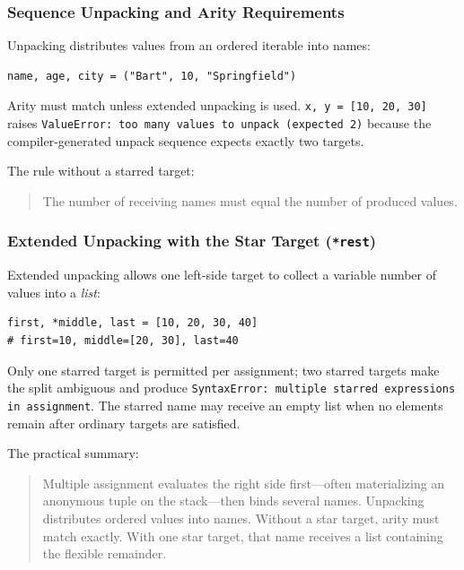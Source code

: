 \documentclass[a4paper,twoside]{report}
\begin{document}
\subsubsection{Sequence Unpacking and Arity Requirements}

Unpacking distributes values from an ordered iterable into names:

\begin{verbatim}
name, age, city = ("Bart", 10, "Springfield")
\end{verbatim}

Arity must match unless extended unpacking is used. \texttt{x, y = [10, 20, 30]} raises \texttt{ValueError: too many values to unpack (expected 2)} because the compiler-generated unpack sequence expects exactly two targets.

The rule without a starred target:

\begin{quote}
The number of receiving names must equal the number of produced values.
\end{quote}

\subsubsection{Extended Unpacking with the Star Target (\texttt{*rest})}

Extended unpacking allows one left-side target to collect a variable number of values into a \emph{list}:

\begin{verbatim}
first, *middle, last = [10, 20, 30, 40]
# first=10, middle=[20, 30], last=40
\end{verbatim}

Only one starred target is permitted per assignment; two starred targets make the split ambiguous and produce \texttt{SyntaxError: multiple starred expressions in assignment}. The starred name may receive an empty list when no elements remain after ordinary targets are satisfied.

The practical summary:

\begin{quote}
Multiple assignment evaluates the right side first---often materializing an anonymous tuple on the stack---then binds several names. Unpacking distributes ordered values into names. Without a star target, arity must match exactly. With one star target, that name receives a list containing the flexible remainder.
\end{quote}
\end{document}
